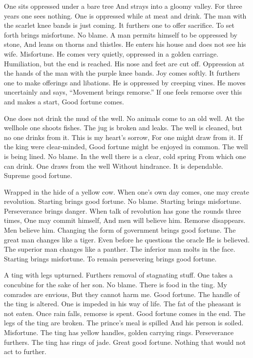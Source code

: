{One sits oppressed under a bare tree
 And strays into a gloomy valley.
 For three years one sees nothing.}
{One is oppressed while at meat and drink.
 The man with the scarlet knee bands is just coming.
 It furthers one to offer sacrifice.
 To set forth brings misfortune.
 No blame.}
{A man permits himself to be oppressed by stone,
 And leans on thorns and thistles.
 He enters his house and does not see his wife.
 Misfortune.}
{He comes very quietly, oppressed in a golden carriage.
 Humiliation, but the end is reached.}
{His nose and feet are cut off.
 Oppression at the hands of the man with the purple knee bands.
 Joy comes softly.
 It furthers one to make offerings and libations.}
{He is oppressed by creeping vines.
 He moves uncertainly and says,
 “Movement brings remorse.”
 If one feels remorse over this and makes a start,
 Good fortune comes.}

{One does not drink the mud of the well.
 No animals come to an old well.}
{At the wellhole one shoots fishes.
 The jug is broken and leaks.}
{The well is cleaned, but no one drinks from it.
 This is my heart’s sorrow,
 For one might draw from it.
 If the king were clear-minded,
 Good fortune might be enjoyed in common.}
{The well is being lined. No blame.}
{In the well there is a clear, cold spring
 From which one can drink.}
{One draws from the well
 Without hindrance.
 It is dependable.
 Supreme good fortune.}

{Wrapped in the hide of a yellow cow.}
{When one’s own day comes, one may create revolution.
 Starting brings good fortune.
 No blame.}
{Starting brings misfortune.
 Perseverance brings danger.
 When talk of revolution has gone the rounds three times,
 One may commit himself,
 And men will believe him.}
{Remorse disappears. Men believe him.
 Changing the form of government brings good fortune.}
{The great man changes like a tiger.
 Even before he questions the oracle
 He is believed.}
{The superior man changes like a panther.
 The inferior man molts in the face.
 Starting brings misfortune.
 To remain persevering brings good fortune.}

{A ting with legs upturned.
 Furthers removal of stagnating stuff.
 One takes a concubine for the sake of her son.
 No blame.}
{There is food in the ting.
 My comrades are envious,
 But they cannot harm me.
 Good fortune.}
{The handle of the ting is altered.
 One is impeded in his way of life.
 The fat of the pheasant is not eaten.
 Once rain falls, remorse is spent.
 Good fortune comes in the end.}
{The legs of the ting are broken.
 The prince’s meal is spilled
 And his person is soiled.
 Misfortune.}
{The ting has yellow handles, golden carrying rings.
 Perseverance furthers.}
{The ting has rings of jade.
 Great good fortune.
 Nothing that would not act to further.}

